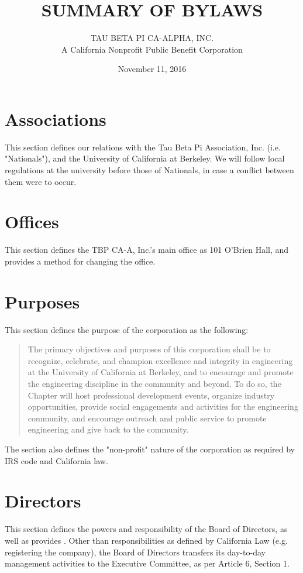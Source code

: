 \documentclass{article}
\begin{document}
	\title{\textbf {\uppercase{Summary of Bylaws}}}
	\author{\uppercase{Tau Beta Pi CA-Alpha, Inc.} \\ A California Nonprofit Public Benefit Corporation}
	\date{November 11, 2016}
	\maketitle
	\clearpage
	
	
	\section{Associations}
	This section defines our relations with the Tau Beta Pi Association, Inc. (i.e. "Nationals"), and the University of California at Berkeley. We will follow local regulations at the university before those of Nationals, in case a conflict between them were to occur.
	
	\section{Offices}
	This section defines the TBP CA-A, Inc.'s main office as 101 O'Brien Hall, and provides a method for changing the office.
	
	\section{Purposes}
	This section defines the purpose of the corporation as the following:
	\blockquote{The primary objectives and purposes of this corporation shall be to recognize, celebrate, and champion excellence and integrity in engineering at the University of California at Berkeley, and to encourage and promote the engineering discipline in the community and beyond. To do so, the Chapter will host professional development events, organize industry opportunities, provide social engagements and activities for the engineering community, and encourage outreach and public service to promote engineering and give back to the community.}
	The section also defines the "non-profit" nature of the corporation as required by IRS code and California law.
	
	\section{Directors}
	This section defines the powers and responsibility of the Board of Directors, as well as provides . Other than responsibilities as defined by California Law (e.g. registering the company), the Board of Directors transfers its day-to-day management activities to the Executive Committee, as per Article 6, Section 1.
	
\end{document}
